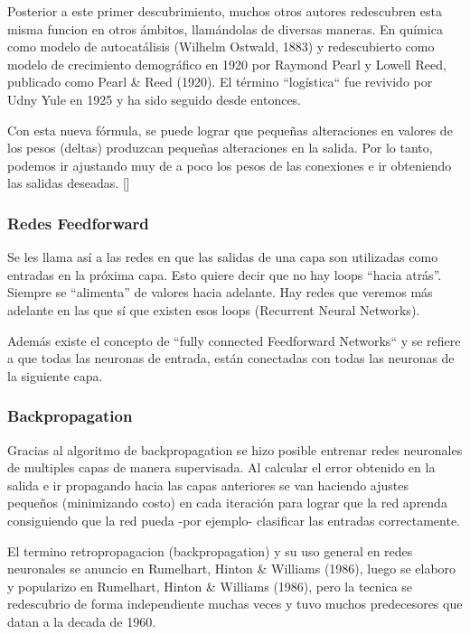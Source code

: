 \documentclass[a4paper]{article}
\begin{document}
Posterior a este primer descubrimiento, muchos otros autores
redescubren esta misma funcion en otros ámbitos, llamándolas de
diversas maneras. En química como modelo de autocatálisis (Wilhelm 
Ostwald, 1883) y redescubierto como modelo de crecimiento
demográfico en 1920 por Raymond Pearl y Lowell Reed, publicado 
como Pearl \& Reed (1920). El término ``logística`` fue revivido 
por Udny Yule en 1925 y ha sido seguido desde entonces.



Con esta nueva fórmula, se puede lograr que pequeñas alteraciones 
en valores de los pesos (deltas) produzcan pequeñas alteraciones 
en la salida. Por lo tanto, podemos ir ajustando muy de a poco los 
pesos de las conexiones e ir obteniendo las salidas deseadas.
[]

\subsubsection{Redes Feedforward}

Se les llama así a las redes en que las salidas de una capa son 
utilizadas como entradas en la próxima capa. Esto quiere decir que 
no hay loops “hacia atrás”. Siempre se “alimenta” de valores hacia 
adelante. Hay redes que veremos más adelante en las que sí que 
existen esos loops (Recurrent Neural Networks).

Además existe el concepto de ``fully connected Feedforward 
Networks`` y se refiere a que todas las neuronas de entrada, están 
conectadas con todas las neuronas de la siguiente capa.

\subsubsection{Backpropagation}

Gracias al algoritmo de backpropagation se hizo posible entrenar 
redes neuronales de multiples capas de manera supervisada. Al 
calcular el error obtenido en la salida e ir propagando hacia las 
capas anteriores se van haciendo ajustes pequeños (minimizando 
costo) en cada iteración para lograr que la red aprenda 
consiguiendo que la red pueda -por ejemplo- clasificar las 
entradas correctamente.

El termino retropropagacion (backpropagation) y su uso general en 
redes neuronales se anuncio en Rumelhart, Hinton \& Williams 
(1986), luego se elaboro y popularizo en Rumelhart, 
Hinton \& Williams (1986), pero la tecnica se redescubrio de forma 
independiente muchas veces y tuvo muchos predecesores que datan a 
la decada de 1960.
\end{document}
